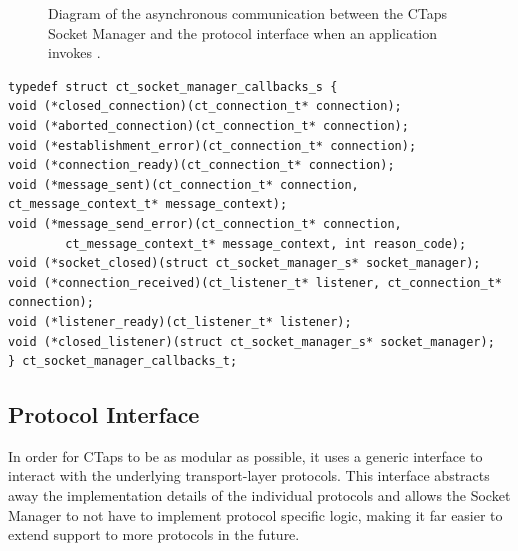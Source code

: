 \begin{figure}[htbp]
\caption[Flow of internal callbacks in CTaps]{Diagram of the asynchronous communication
between the CTaps Socket Manager and the protocol interface when an application invokes .}
\label{fig:async-close-flow}
\end{figure}

\begin{listing}[htbp]
\begin{verbatim}
typedef struct ct_socket_manager_callbacks_s {
void (*closed_connection)(ct_connection_t* connection);
void (*aborted_connection)(ct_connection_t* connection);
void (*establishment_error)(ct_connection_t* connection);
void (*connection_ready)(ct_connection_t* connection);
void (*message_sent)(ct_connection_t* connection, ct_message_context_t* message_context);
void (*message_send_error)(ct_connection_t* connection,
        ct_message_context_t* message_context, int reason_code);
void (*socket_closed)(struct ct_socket_manager_s* socket_manager);
void (*connection_received)(ct_listener_t* listener, ct_connection_t* connection);
void (*listener_ready)(ct_listener_t* listener);
void (*closed_listener)(struct ct_socket_manager_s* socket_manager);
} ct_socket_manager_callbacks_t;
\end{verbatim}
\caption[Socket Manager internal callbacks]{The internal callbacks used for communication between
the Socket Manager and the protocol interface.}
\label{lst:socket-manager-callbacks}
\end{listing}

\subsection{Protocol Interface}
In order for CTaps to be as modular as possible,
it uses a generic interface to interact with the underlying transport-layer protocols.
This interface abstracts away the implementation details of the individual
protocols and allows the Socket Manager to not have to implement protocol
specific logic, making it far easier to extend support to more protocols in
the future.

